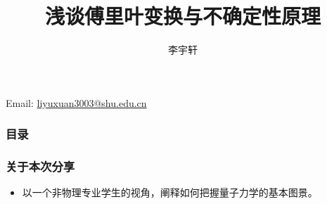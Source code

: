 \documentclass[compress,aspectratio=169]{ctexbeamer}
\title{浅谈傅里叶变换与不确定性原理}
\institute{上海大学\quad 微电子学院}
\author{李宇轩}
\begin{document}
\begin{frame}
    \titlepage
     Email: \url{liyuxuan3003@shu.edu.cn}
\end{frame}

\begin{frame}
    \frametitle{目录}
    \tableofcontents[hideallsubsections]
\end{frame}

\begin{frame}
    \frametitle{关于本次分享}
    \begin{itemize}
        \item 以一个非物理专业学生的视角，阐释如何把握量子力学的基本图景。
    \end{itemize}
\end{frame}

\setlength{\parskip}{6pt}





\end{document}
